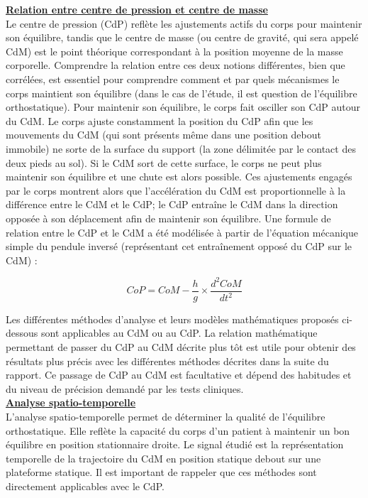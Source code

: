 \textbf{\underline{Relation entre centre de pression et centre de masse}}\\

Le centre de pression (CdP) reflète les ajustements actifs du corps pour maintenir son équilibre, tandis que le centre de masse (ou centre de gravité, qui sera appelé CdM) est le point théorique correspondant à la position moyenne de la masse corporelle.
Comprendre la relation entre ces deux notions différentes, bien que corrélées, est essentiel pour comprendre comment et par quels mécanismes le corps maintient son équilibre (dans le cas de l'étude, il est question de l'équilibre orthostatique).
Pour maintenir son équilibre, le corps fait osciller son CdP autour du CdM. 
Le corps ajuste constamment la position du CdP afin que les mouvements du CdM (qui sont présents même dans une position debout immobile) ne sorte de la surface du support (la zone délimitée par le contact des deux pieds au sol). 
Si le CdM sort de cette surface, le corps ne peut plus maintenir son équilibre et une chute est alors possible.
Ces ajustements engagés par le corps montrent alors que l'accélération du CdM est proportionnelle à la différence entre le CdM et le CdP; le CdP entraîne le CdM dans la direction opposée à son déplacement afin de maintenir son équilibre.
Une formule de relation entre le CdP et le CdM a été modélisée à partir de l'équation mécanique simple du pendule inversé (représentant cet entraînement opposé du CdP sur le CdM) : 

\[
    CoP = CoM - \frac{h}{g} \times \frac{d^2 CoM}{dt^2} \tag{1}
\]

Les différentes méthodes d'analyse et leurs modèles mathématiques proposés ci-dessous sont applicables au CdM ou au CdP.
La relation mathématique permettant de passer du CdP au CdM décrite plus tôt est utile pour obtenir des résultats plus précis avec les différentes méthodes décrites dans la suite du rapport.
Ce passage de CdP au CdM est facultative et dépend des habitudes et du niveau de précision demandé par les tests cliniques.\\

\textbf{\underline{Analyse spatio-temporelle}}\\

L'analyse spatio-temporelle permet de déterminer la qualité de l'équilibre orthostatique. 
Elle reflète la capacité du corps d'un patient à maintenir un bon équilibre en position stationnaire droite. 
Le signal étudié est la représentation temporelle de la trajectoire du CdM en position statique debout sur une plateforme statique. 
Il est important de rappeler que ces méthodes sont directement applicables avec le CdP.\\



